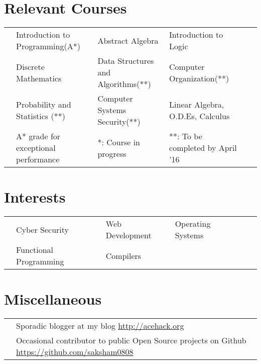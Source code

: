 \documentclass[11pt,a4paper]{article}
\begin{document}
\vspace{-0.6cm}
\section*{Relevant Courses}
\vspace{-0.3cm}
\begin{tabular}{L{0.05cm} L{5.8cm} L{6.5cm} L{7.5cm} L{8cm} L{13cm}}
& Introduction to Programming(A*)  & Abstract Algebra & Introduction to Logic\\
& Discrete Mathematics             & Data Structures and Algorithms(**) & Computer Organization(**)\\
& Probability and Statistics (**)  & Computer Systems Security(**) & Linear Algebra, O.D.Es, Calculus\\
  \vspace{0.3cm}
& \footnotesize{A* grade for exceptional performance}
& \footnotesize{*: Course in progress}
& \footnotesize{**: To be completed by April '16}
\end{tabular}

\vspace{-0.8cm}
\section*{Interests}
\vspace{-0.3cm}
\begin{tabular}{L{0.05cm} L{5.8cm} L{6.5cm} L{7.5cm} L{8cm} L{13cm}}
  & Cyber Security    & Web Development        & Operating Systems\\
  & Functional Programming & Compilers
\end{tabular}

\vspace{-0.5cm}
\section*{Miscellaneous}
\vspace{-0.3cm}
\begin{tabular}{L{0.05cm} l}
  & Sporadic blogger at my blog \url{http://acehack.org}\\
  & Occasional contributor to public Open Source projects on Github \url{https://github.com/saksham0808}
\end{tabular}
\end{document}
